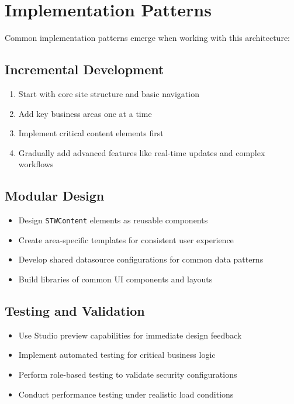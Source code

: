 \section{Implementation Patterns}
\label{sec:implementation-patterns}

Common implementation patterns emerge when working with this architecture:

\subsection{Incremental Development}

\begin{enumerate}
	\item Start with core site structure and basic navigation
	\item Add key business areas one at a time
	\item Implement critical content elements first
	\item Gradually add advanced features like real-time updates and complex workflows
\end{enumerate}

\subsection{Modular Design}

\begin{itemize}
	\item Design \texttt{STWContent} elements as reusable components
	\item Create area-specific templates for consistent user experience
	\item Develop shared datasource configurations for common data patterns
	\item Build libraries of common UI components and layouts
\end{itemize}

\subsection{Testing and Validation}

\begin{itemize}
	\item Use Studio preview capabilities for immediate design feedback
	\item Implement automated testing for critical business logic
	\item Perform role-based testing to validate security configurations
	\item Conduct performance testing under realistic load conditions
\end{itemize}

